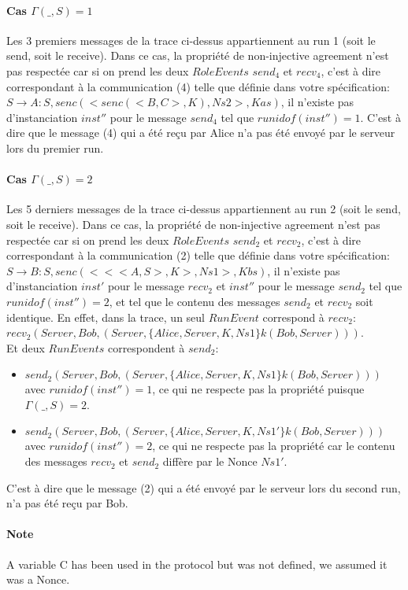 \documentclass[10pt,a4paper]{article}
\begin{document}
\paragraph{Cas $\Gamma(\_, S) = 1$}
Les 3 premiers messages de la trace ci-dessus appartiennent au run 1 (soit le send, soit le receive).
Dans ce cas, la propriété de non-injective agreement n'est pas respectée car si on prend les deux $RoleEvents$ $send_4$ et $recv_4$, c'est à dire correspondant à la communication (4) telle que définie dans votre spécification: $S \rightarrow A : S , senc ( < senc ( < B , C > , K ) , Ns2 > , Kas )$, il n'existe pas d'instanciation $inst''$ pour le message $send_4$ tel que $runidof(inst'') = 1$.
C'est à dire que le message (4) qui a été reçu par Alice n'a pas été envoyé par le serveur lors du premier run.

\paragraph{Cas $\Gamma(\_, S) = 2$}
Les 5 derniers messages de la trace ci-dessus appartiennent au run 2 (soit le send, soit le receive).
Dans ce cas, la propriété de non-injective agreement n'est pas respectée car si on prend les deux $RoleEvents$ $send_2$ et $recv_2$, c'est à dire correspondant à la communication (2) telle que définie dans votre spécification: $S \rightarrow B : S , senc ( < < < A , S > , K > , Ns1 > , Kbs ) $, il n'existe pas d'instanciation $inst'$ pour le message $recv_2$ et $inst''$ pour le message $send_2$ tel que $runidof(inst'') = 2$, et tel que le contenu des messages $send_2$ et  $recv_2$ soit identique.
En effet, dans la trace, un seul $RunEvent$ correspond à $recv_2$: $recv_2(Server, Bob, (Server,\{Alice,Server,K,Ns1\}k(Bob,Server)))$.\\
Et deux $RunEvents$ correspondent à $send_2$:
\begin{itemize}
\item $send_2(Server, Bob, (Server,\{Alice,Server,K,Ns1\}k(Bob,Server)))$ avec $runidof(inst'') = 1$, ce qui ne respecte pas la propriété puisque $\Gamma(\_, S) = 2$.
\item $send_2(Server, Bob, (Server,\{Alice,Server,K,Ns1'\}k(Bob,Server)))$ avec $runidof(inst'') = 2$, ce qui ne respecte pas la propriété car le contenu des messages $recv_2$ et $send_2$ diffère par le Nonce $Ns1'$.
\end{itemize}
C'est à dire que le message (2) qui a été envoyé par le serveur lors du second run, n'a pas été reçu par Bob.

\paragraph{Note}
A variable C has been used in the protocol but was not defined, we assumed it was a Nonce.
\end{document}
